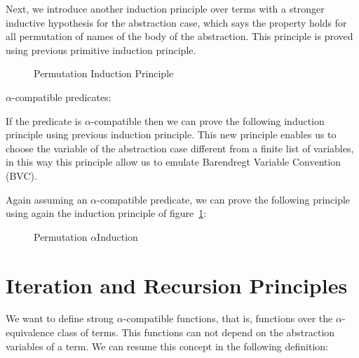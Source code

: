 \documentclass{article}
\newcommand{\alp}{\ensuremath{\alpha}}
\begin{document}
Next, we introduce another induction principle over terms with a stronger inductive hypothesis for the abstraction case, which says the property holds for all permutation of names of the body of the abstraction. This principle is proved using previous primitive induction principle.

\begin{figure}[!ht]
  \caption{Permutation Induction Principle}
\label{fig:permInd}
\end{figure}

\alp-compatible predicates:

 \hspace{5px}

If the predicate is \alp-compatible then we can prove the following induction principle using previous  induction principle. This new principle enables us to choose the variable of the abstraction case different from a finite list of variables, in this way this principle allow us to emulate Barendregt Variable Convention (BVC).

 \hspace{5px}

Again assuming an \alp-compatible predicate, we can prove the following principle using again the induction principle of figure~\ref{fig:permInd}:

\begin{figure}[!ht]
  \caption{Permutation \alp Induction}
\label{fig:permAlphaInd}
\end{figure}

\section{Iteration and Recursion Principles}
\label{sec:recursion}

We want to define strong \alp-compatible functions, that is, functions over the \alp-equivalence class of terms. This functions can not depend on the abstraction variables of a term. We can resume this concept in the following definition:

 \hspace{5px}
\end{document}
